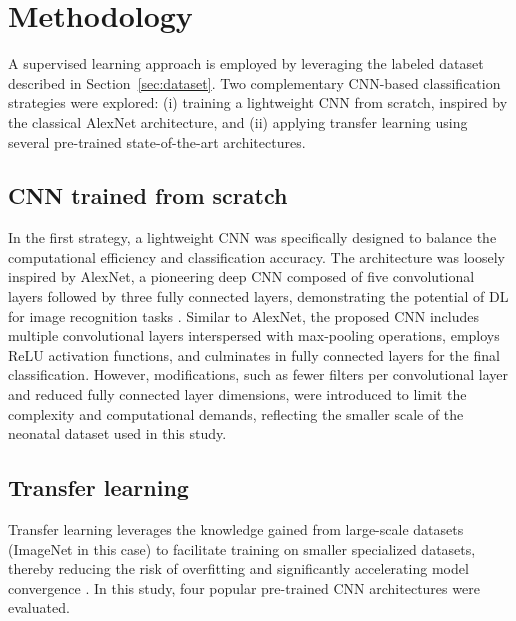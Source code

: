 \documentclass[runningheads]{llncs}
\begin{document}
\section{Methodology}
\label{sec:methodology}

A supervised learning approach is employed by leveraging the labeled dataset described in Section~\ref{sec:dataset}. Two complementary CNN-based classification strategies were explored: (i) training a lightweight CNN from scratch, inspired by the classical AlexNet architecture, and (ii) applying transfer learning using several pre-trained state-of-the-art architectures.

\subsection{CNN trained from scratch}

In the first strategy, a lightweight CNN was specifically designed to balance the computational efficiency and classification accuracy. The architecture was loosely inspired by AlexNet, a pioneering deep CNN composed of five convolutional layers followed by three fully connected layers, demonstrating the potential of DL for image recognition tasks \cite{krizhevsky2017imagenet}. Similar to AlexNet, the proposed CNN includes multiple convolutional layers interspersed with max-pooling operations, employs ReLU activation functions, and culminates in fully connected layers for the final classification. However, modifications, such as fewer filters per convolutional layer and reduced fully connected layer dimensions, were introduced to limit the complexity and computational demands, reflecting the smaller scale of the neonatal dataset used in this study.

\subsection{Transfer learning}

Transfer learning leverages the knowledge gained from large-scale datasets (ImageNet in this case) to facilitate training on smaller specialized datasets, thereby reducing the risk of overfitting and significantly accelerating model convergence \cite{tan2018survey}. In this study, four popular pre-trained CNN architectures were evaluated.
\end{document}
